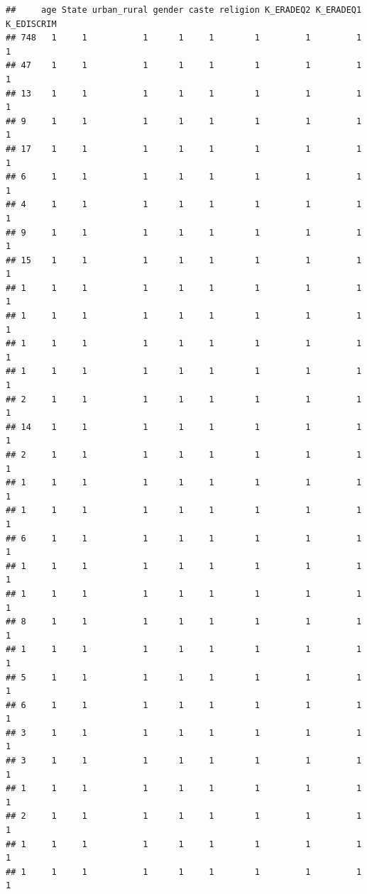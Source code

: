 \documentclass[
]{article}
\begin{document}
\begin{verbatim}
##     age State urban_rural gender caste religion K_ERADEQ2 K_ERADEQ1 K_EDISCRIM
## 748   1     1           1      1     1        1         1         1          1
## 47    1     1           1      1     1        1         1         1          1
## 13    1     1           1      1     1        1         1         1          1
## 9     1     1           1      1     1        1         1         1          1
## 17    1     1           1      1     1        1         1         1          1
## 6     1     1           1      1     1        1         1         1          1
## 4     1     1           1      1     1        1         1         1          1
## 9     1     1           1      1     1        1         1         1          1
## 15    1     1           1      1     1        1         1         1          1
## 1     1     1           1      1     1        1         1         1          1
## 1     1     1           1      1     1        1         1         1          1
## 1     1     1           1      1     1        1         1         1          1
## 1     1     1           1      1     1        1         1         1          1
## 2     1     1           1      1     1        1         1         1          1
## 14    1     1           1      1     1        1         1         1          1
## 2     1     1           1      1     1        1         1         1          1
## 1     1     1           1      1     1        1         1         1          1
## 1     1     1           1      1     1        1         1         1          1
## 6     1     1           1      1     1        1         1         1          1
## 1     1     1           1      1     1        1         1         1          1
## 1     1     1           1      1     1        1         1         1          1
## 8     1     1           1      1     1        1         1         1          1
## 1     1     1           1      1     1        1         1         1          1
## 5     1     1           1      1     1        1         1         1          1
## 6     1     1           1      1     1        1         1         1          1
## 3     1     1           1      1     1        1         1         1          1
## 3     1     1           1      1     1        1         1         1          1
## 1     1     1           1      1     1        1         1         1          1
## 2     1     1           1      1     1        1         1         1          1
## 1     1     1           1      1     1        1         1         1          1
## 1     1     1           1      1     1        1         1         1          1

\end{verbatim}
\end{document}
